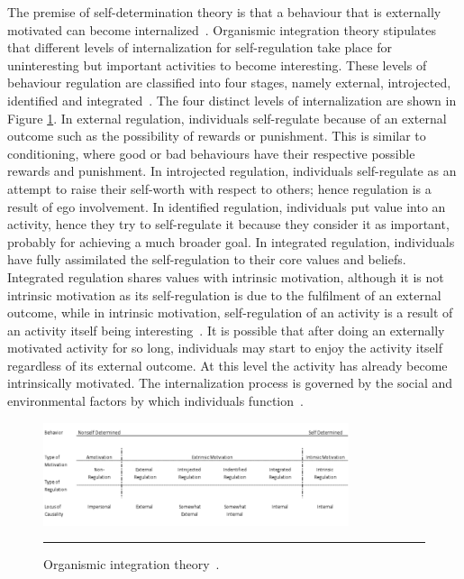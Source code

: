 The premise of self-determination theory is that a behaviour that is externally motivated can become internalized~\citep{ryan2000intrinsic}.
Organismic integration theory stipulates that different levels of internalization for self-regulation take place for uninteresting but important activities to become interesting. These levels of behaviour regulation are classified into four stages, namely external, introjected, identified and integrated~\citep{ryan2000intrinsic}. The four distinct levels of internalization are shown in Figure \ref{figure:oit}. In external regulation, individuals self-regulate because of an external outcome such as  the possibility of rewards or punishment. This is similar to conditioning, where good or bad behaviours have their respective possible rewards and punishment. In introjected regulation, individuals self-regulate as an attempt to raise their self-worth with respect to others; hence regulation is a result of ego involvement. In identified regulation, individuals put value into an activity, hence they try to self-regulate it because they consider it as important, probably for achieving a much broader goal. In integrated regulation, individuals have fully assimilated the self-regulation to their core values and beliefs. Integrated regulation shares values with intrinsic motivation, although it is not intrinsic motivation as its self-regulation is due to the fulfilment of an external outcome, while in intrinsic motivation, self-regulation of an activity is a result of an activity itself being interesting~\citep{ryan2000intrinsic}. It is possible that after doing an externally motivated activity for so long, individuals may start to enjoy the activity itself regardless of its external outcome. At this level the activity has already become intrinsically motivated. The internalization process is governed by the social and environmental factors by which individuals function~\citep{ryan2000:self,lee2015:relating}.

\begin{figure}[htbp]
  \centering
    \includegraphics[width=0.8\textwidth]{Figures/oit.png}
    \rule{35em}{0.5pt}
  \caption{Organismic integration theory~\citep{ryan2000intrinsic}.}
  \label{figure:oit}
\end{figure}

